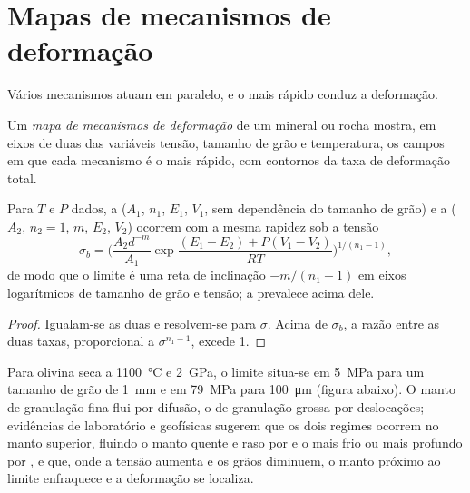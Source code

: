 \section{Mapas de mecanismos de deformação}

Vários mecanismos atuam em paralelo, e o mais rápido conduz a deformação.

\begin{definition}\label{def:b3:deformation-mechanisms:deformation-map}
Um \emph{mapa de mecanismos de deformação} de um
mineral ou rocha mostra, em eixos de duas das variáveis tensão, tamanho de grão e
temperatura, os campos em que cada mecanismo é o mais rápido, com contornos
da taxa de deformação total.
\end{definition}

\begin{proposition}\label{prop:b3:deformation-mechanisms:boundary}
Para $T$ e $P$ dados, a  ($A_1$, $n_1$, $E_1$, $V_1$, sem
dependência do tamanho de grão) e a  ($A_2$, $n_2 = 1$, $m$, $E_2$, $V_2$)
ocorrem com a mesma rapidez sob a tensão
\[
  \sigma_b = \biggl(\frac{A_2d^{-m}}{A_1}
  \exp\frac{(E_1 - E_2) + P(V_1 - V_2)}{RT}\biggr)^{1/(n_1 - 1)} ,
\]
de modo que o limite é uma reta de inclinação $-m/(n_1 - 1)$ em eixos logarítmicos
de tamanho de grão e tensão; a  prevalece acima dele.
\end{proposition}

\begin{proof}
Igualam-se as duas  e resolvem-se para $\sigma$. Acima de $\sigma_b$, a razão
entre as duas taxas, proporcional a $\sigma^{n_1 - 1}$, excede 1.
\end{proof}

Para olivina seca a \qty{1100}{\celsius} e \qty{2}{GPa}, o limite situa-se em
\qty{5}{MPa} para um tamanho de grão de \qty{1}{mm} e em \qty{79}{MPa} para
\qty{100}{\micro m} (figura abaixo). O manto de granulação fina flui por difusão,
o de granulação grossa por deslocações; evidências de laboratório e geofísicas sugerem
que os dois regimes ocorrem no manto superior, fluindo o manto quente e raso por
 e o mais frio ou mais profundo por , e que,
onde a tensão aumenta e os grãos diminuem, o manto próximo ao limite enfraquece e
a deformação se localiza.

